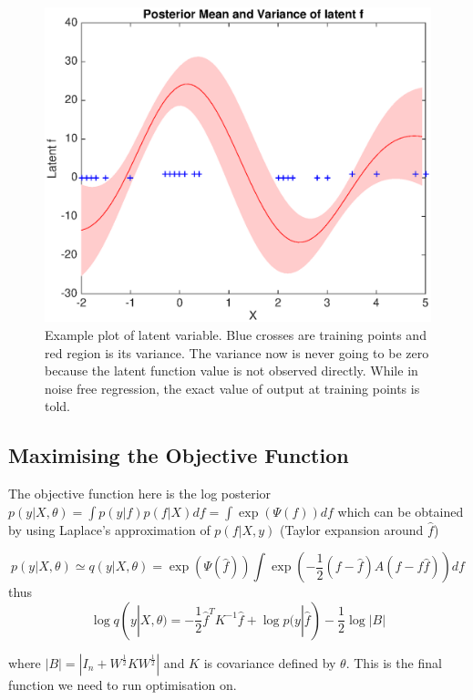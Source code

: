 \documentclass[11pt]{report}
\numberwithin{equation}{chapter}
\begin{document}
\begin{spacing}{2}
\begin{figure}
\centering
\includegraphics[scale=0.55]{classification_latent_f.eps}
\caption{Example plot of latent variable. Blue crosses are training points and red region is its variance. The variance now is never going to be zero because the latent function value is not observed directly. While in noise free regression, the exact value of output at training points is told.}
\end{figure}

\subsection{Maximising the Objective Function}
The objective function here is the log posterior $p(y|X,\theta) = \int p(y|f)p(f|X) df = \int \operatorname{exp}(\Psi(f)) df$ which can be obtained by using Laplace's approximation of $p(f|X,y)$ (Taylor expansion around $\hat{f}$)

\begin{equation}
p(y|X,\theta) \simeq q(y|X,\theta) = \exp(\Psi(\hat{f})) \int \operatorname{exp}(-\frac{1}{2}(f - \hat{f})A(f-f\hat{f})) df
\end{equation}
thus
\begin{equation}
\operatorname{log}q(y|X,\theta) = -\frac{1}{2}\hat{f}^TK^{-1}\hat{f} + \operatorname{log}p(y|\hat{f}) - \frac{1}{2}\operatorname{log}|B|
\label{eq:marg_likelihood_classification}
\end{equation}

where $|B| = |I_n + W^{\frac{1}{2}} K W^{\frac{1}{2}}|$ and $K$ is covariance defined by $\theta$. This is the final function we need to run optimisation on. 


\end{spacing}
\end{document}
